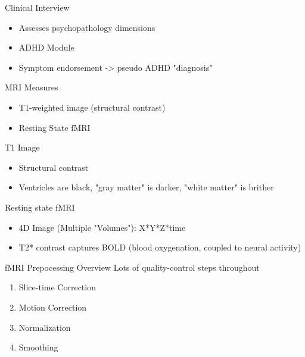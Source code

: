\documentclass[presentation]{beamer}
\begin{document}
\begin{frame}[label={sec:orgheadline7}]{Clinical Interview}
\begin{itemize}
\item Assesses psychopathology dimensions
\item ADHD Module
\item Symptom endorsement -> pseudo ADHD "diagnosis"
\end{itemize}
\end{frame}
\begin{frame}[label={sec:orgheadline8}]{MRI Measures}
\begin{itemize}
\item T1-weighted image (structural contrast)
\item Resting State fMRI
\end{itemize}
\begin{block}{T1 Image}
\begin{itemize}
\item Structural contrast
\item Ventricles are black, "gray matter" is darker, "white matter" is brither
\end{itemize}
\end{block}
\begin{block}{Resting state fMRI}
\begin{itemize}
\item 4D Image (Multiple "Volumes"): X*Y*Z*time
\item T2* contrast captures BOLD (blood oxygenation, coupled to neural activity)
\end{itemize}
\end{block}
\end{frame}
\begin{frame}[label={sec:orgheadline9}]{fMRI Prepocessing Overview}
Lots of quality-control steps throughout
\begin{enumerate}
\item Slice-time Correction
\item Motion Correction
\item Normalization
\item Smoothing
\end{enumerate}
\end{frame}
\end{document}
